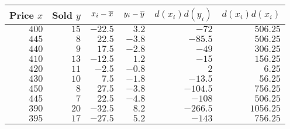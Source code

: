 \begin{tabular}{rrrrrr} \toprule
Price $x$ & Sold $y$ & $x_i - \overline{x}$ & $y_i - \overline{y}$ & $d(x_i)d(y_i)$ & $d(x_i)d(x_i)$ \\\midrule
$400$     & $15$     & $-22.5$       & $3.2$         & $-72$         & $506.25$       \\[4pt]
$445$     & $8$      & $22.5$        & $-3.8$        & $-85.5$       & $506.25$       \\[4pt]
$440$     & $9$      & $17.5$        & $-2.8$        & $-49$         & $306.25$       \\[4pt]
$410$     & $13$     & $-12.5$       & $1.2$         & $-15$         & $156.25$       \\[4pt]
$420$     & $11$     & $-2.5$        & $-0.8$        & $2$           & $6.25$         \\[4pt]
$430$     & $10$     & $7.5$         & $-1.8$        & $-13.5$       & $56.25$        \\[4pt]
$450$     & $8$      & $27.5$        & $-3.8$        & $-104.5$      & $756.25$       \\[4pt]
$445$     & $7$      & $22.5$        & $-4.8$        & $-108$        & $506.25$       \\[4pt]
$390$     & $20$     & $-32.5$       & $8.2$         & $-266.5$      & $1056.25$      \\[4pt]
$395$     & $17$     & $-27.5$       & $5.2$         & $-143$        & $756.25$       \\\bottomrule
\end{tabular}
